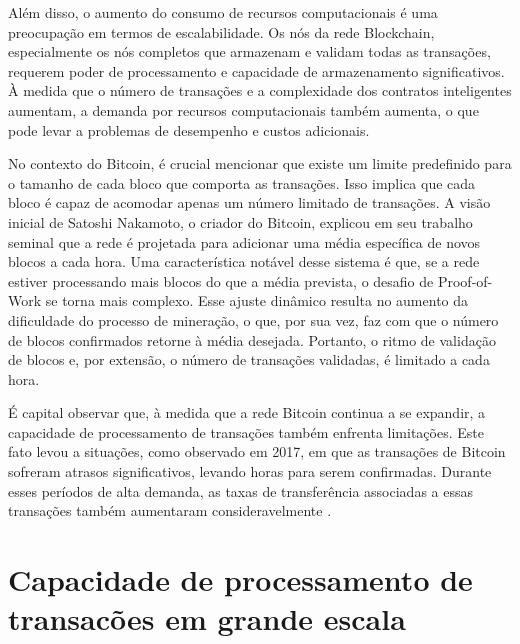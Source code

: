 Além disso, o aumento do consumo de recursos computacionais é uma preocupação em termos de escalabilidade. Os nós da rede Blockchain, especialmente os nós completos que armazenam e validam todas as transações, requerem poder de processamento e capacidade de armazenamento significativos. À medida que o número de transações e a complexidade dos contratos inteligentes aumentam, a demanda por recursos computacionais também aumenta, o que pode levar a problemas de desempenho e custos adicionais. 

No contexto do Bitcoin, é crucial mencionar que existe um limite predefinido para o tamanho de cada bloco que comporta as transações. Isso implica que cada bloco é capaz de acomodar apenas um número limitado de transações. A visão inicial de Satoshi Nakamoto, o criador do Bitcoin, explicou em seu trabalho seminal \cite{Blockchain-Satochi} que a rede é projetada para adicionar uma média específica de novos blocos a cada hora.
Uma característica notável desse sistema é que, se a rede estiver processando mais blocos do que a média prevista, o desafio de Proof-of-Work se torna mais complexo. Esse ajuste dinâmico resulta no aumento da dificuldade do processo de mineração, o que, por sua vez, faz com que o número de blocos confirmados retorne à média desejada. Portanto, o ritmo de validação de blocos e, por extensão, o número de transações validadas, é limitado a cada hora.

É capital  observar que, à medida que a rede Bitcoin continua a se expandir, a capacidade de processamento de transações também enfrenta limitações. Este fato levou a situações, como observado em 2017, em que as transações de Bitcoin sofreram atrasos significativos, levando horas para serem confirmadas. Durante esses períodos de alta demanda, as taxas de transferência associadas a essas transações também aumentaram consideravelmente \cite{Guia_do_Bitcoin}.



\section{Capacidade de processamento de transacões em grande escala}


